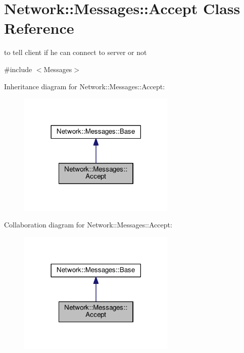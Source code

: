 \hypertarget{class_network_1_1_messages_1_1_accept}{}\section{Network\+:\+:Messages\+:\+:Accept Class Reference}
\label{class_network_1_1_messages_1_1_accept}


to tell client if he can connect to server or not  




{\ttfamily \#include $<$Messages$>$}



Inheritance diagram for Network\+:\+:Messages\+:\+:Accept\+:
\nopagebreak
\begin{figure}[H]
\begin{center}
\leavevmode
\includegraphics[width=213pt]{class_network_1_1_messages_1_1_accept__inherit__graph}
\end{center}
\end{figure}


Collaboration diagram for Network\+:\+:Messages\+:\+:Accept\+:
\nopagebreak
\begin{figure}[H]
\begin{center}
\leavevmode
\includegraphics[width=213pt]{class_network_1_1_messages_1_1_accept__coll__graph}
\end{center}
\end{figure}
